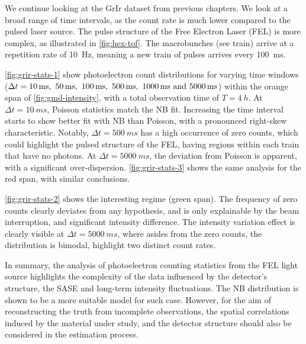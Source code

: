 We continue looking at the \gls{GrIr} dataset from previous chapters. We look at a broad range of time intervals, as the count rate is much lower compared to the pulsed laser source. The pulse structure of the Free Electron Laser (FEL) is more complex, as illustrated in \cref{fig:hex-tof}. The macrobunches (see \gls{train}) arrive at a repetition rate of \qty{10}{Hz}, meaning a new train of \glspl{pulse} arrives every \qty{100}{ms}.


\cref{fig:grir-stats-1} show photoelectron count distributions for varying time windows ($\Delta t = \qtylist{10;50;100;500;1000;5000}{ms}$) within the orange span of \cref{fig:gmd-intensity}, with a total observation time of $T=\qty{4}{h}$. At $\Delta t = \qty{10}{ms}$, Poisson statistics match the \gls{NB} fit. Increasing the time interval starts to show better fit with \gls{NB} than Poisson, with a pronounced right-skew characteristic. Notably, $\Delta t = \qty{500}{ms}$ has a high occurrence of zero counts, which could highlight the pulsed structure of the \gls{FEL}, having regions within each train that have no photons. At $\Delta t = \qty{5000}{ms}$, the deviation from Poisson is apparent, with a significant over-dispersion. \cref{fig:grir-stats-3} shows the same analysis for the red span, with similar conclusions.

\cref{fig:grir-stats-2} shows the interesting regime (green span). The frequency of zero counts clearly deviates from any hypothesis, and is only explainable by the beam interruption, and significant intensity difference. The intensity variation effect is clearly visible at $\Delta t = \qty{5000}{ms}$, where asides from the zero counts, the distribution is bimodal, highlight two distinct count rates.

In summary, the analysis of photoelectron counting statistics from the \gls{FEL} light source highlights the complexity of the data influenced by the detector’s structure, the \gls{SASE} and long-term intensity fluctuations. The \gls{NB} distribution is shown to be a more suitable model for such case. However, for the aim of reconstructing the truth from incomplete observations, the spatial correlations induced by the material under study, and the detector structure should also be considered in the estimation process.


